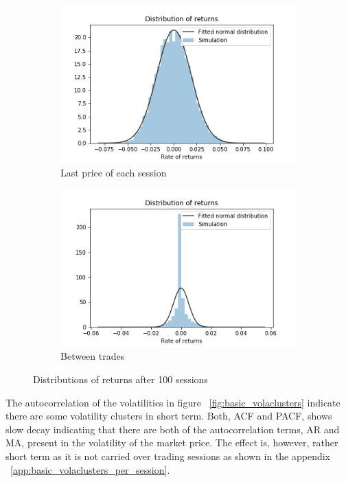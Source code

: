 \begin{figure}
    \centering
    \begin{subfigure}{.5\textwidth}
        \centering
        \includegraphics[width=\linewidth]{plots/basic_fat_tails_per_session.png}
        \caption{Last price of each session}
        \label{fig:basic_return_distr_per_session}
    \end{subfigure}%
    \begin{subfigure}{.5\textwidth}
        \centering
        \includegraphics[width=\linewidth]{plots/basic_fat_tails_intrasession.png}
        \caption{Between trades}
        \label{fig:basic_return_distr_intrasession}
    \end{subfigure}
    \caption{Distributions of returns after 100 sessions}
    \label{fig:basic_return_distr}
\end{figure}


The autocorrelation of the volatilities in figure ~\ref{fig:basic_volaclusters}
indicate there are some volatility clusters in short term. Both, ACF and PACF, shows slow
decay indicating that there are both of the autocorrelation terms, AR and MA,
present in the volatility of the market price. The effect is, however, rather short term
as it is not carried over trading sessions as shown in the appendix ~\ref{app:basic_volaclusters_per_session}.


